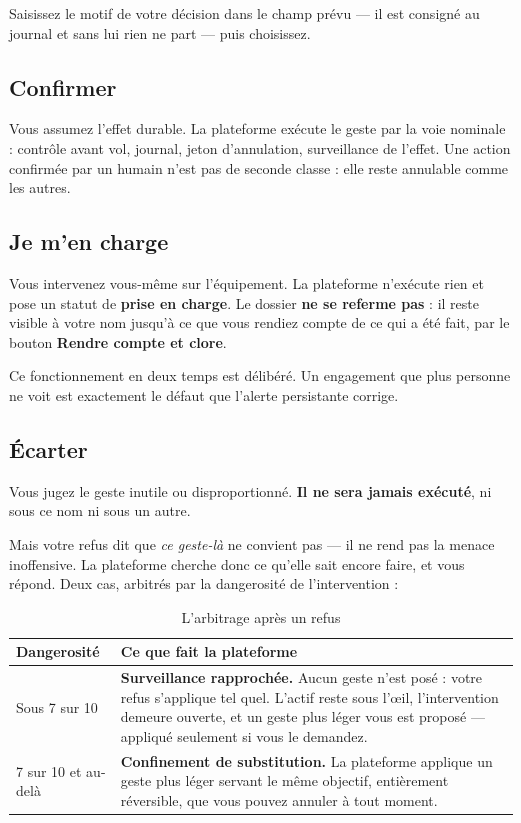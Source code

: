 Saisissez le motif de votre décision dans le champ prévu — il est consigné au
journal et sans lui rien ne part — puis choisissez.

\subsection{Confirmer}

Vous assumez l'effet durable. La plateforme exécute le geste par la voie
nominale : contrôle avant vol, journal, jeton d'annulation, surveillance de
l'effet. Une action confirmée par un humain n'est pas de seconde classe :
elle reste annulable comme les autres.

\subsection{Je m'en charge}

Vous intervenez vous-même sur l'équipement. La plateforme n'exécute rien et
pose un statut de \textbf{prise en charge}. Le dossier \textbf{ne se referme
pas} : il reste visible à votre nom jusqu'à ce que vous rendiez compte de ce
qui a été fait, par le bouton \textbf{Rendre compte et clore}.

\begin{tcolorbox}[colback=green!4!white, colframe=darkgreen,
  title=\textbf{Bon à savoir}, fonttitle=\bfseries, boxrule=0.6pt]
Ce fonctionnement en deux temps est délibéré. Un engagement que plus personne
ne voit est exactement le défaut que l'alerte persistante corrige.
\end{tcolorbox}

\subsection{Écarter}

Vous jugez le geste inutile ou disproportionné. \textbf{Il ne sera jamais
exécuté}, ni sous ce nom ni sous un autre.

Mais votre refus dit que \emph{ce geste-là} ne convient pas — il ne rend pas la
menace inoffensive. La plateforme cherche donc ce qu'elle sait encore faire,
et vous répond. Deux cas, arbitrés par la dangerosité de l'intervention :

\begin{table}[h]
\centering
\begin{tabular}{@{}p{3.4cm}p{10.4cm}@{}}
\toprule
\textbf{Dangerosité} & \textbf{Ce que fait la plateforme} \\
\midrule
Sous 7 sur 10 &
\textbf{Surveillance rapprochée.} Aucun geste n'est posé : votre refus
s'applique tel quel. L'actif reste sous l'œil, l'intervention demeure ouverte,
et un geste plus léger vous est proposé — appliqué seulement si vous le
demandez. \\[8pt]
7 sur 10 et au-delà &
\textbf{Confinement de substitution.} La plateforme applique un geste plus
léger servant le même objectif, entièrement réversible, que vous pouvez annuler
à tout moment. \\
\bottomrule
\end{tabular}
\caption{L'arbitrage après un refus}
\end{table}

